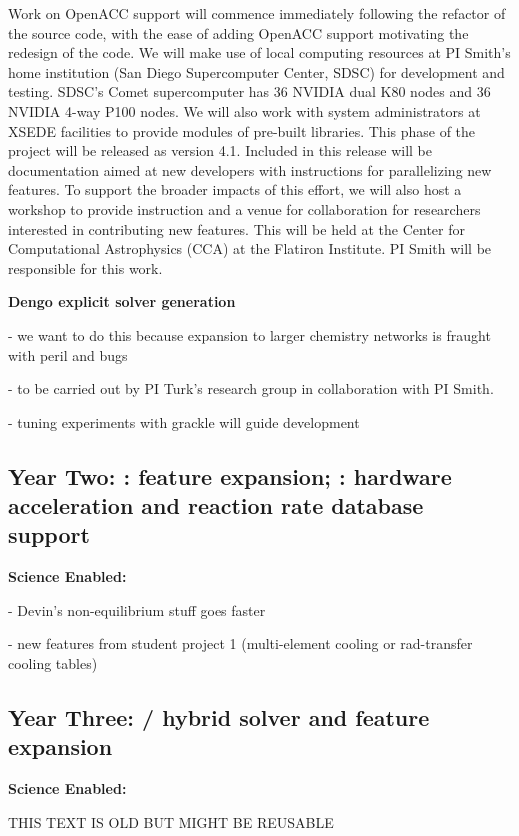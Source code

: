 Work on OpenACC support will commence immediately following the
refactor of the \grackle{} source code, with the ease of adding
OpenACC support motivating the redesign of the code.  We will
make use of local computing resources at PI Smith's home institution
(San Diego Supercomputer Center, SDSC) for development and testing.
SDSC's Comet supercomputer has 36 NVIDIA dual K80 nodes and 36 NVIDIA
4-way P100 nodes. We will also work with system administrators at
XSEDE facilities to provide modules of pre-built \grackle{}
libraries. This phase of the project will be released as \grackle{}
version 4.1. Included in this release will be documentation aimed at
new developers with instructions for parallelizing new features.  To
support the broader impacts of this effort, we will also host a
workshop to provide instruction and a venue for collaboration for
researchers interested in contributing new features. This will be held
at the Center for Computational Astrophysics (CCA) at the Flatiron
Institute.  PI Smith will be responsible for this work.

\noindent \textbf{Dengo explicit solver generation}

- we want to do this because expansion to larger chemistry networks is
fraught with peril and bugs

- to be carried out by PI Turk's research group in collaboration with
PI Smith.

- tuning experiments with grackle will guide development

\subsection{Year Two: \grackle{}: feature expansion; \dengo{}:
  hardware acceleration and reaction rate database support}

\textbf{Science Enabled:}

- Devin's non-equilibrium stuff goes faster

- new features from student project 1 (multi-element cooling or
rad-transfer cooling tables)

\subsection{Year Three: \grackle{}/\dengo{} hybrid solver and
  \grackle{} feature expansion}

\textbf{Science Enabled:}

THIS TEXT IS OLD BUT MIGHT BE REUSABLE

